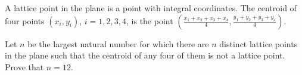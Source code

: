 A lattice point in the plane is a point with integral coordinates. The centroid of four points $(x_i,y_i )$,  $i = 1, 2, 3, 4$,  is the point  $\left(\frac{x_1 +x_2 +x_3 +x_4}{4},\frac{y_1 +y_2 +y_3 +y_4 }{4}\right)$.

Let $n$ be the largest natural number for which there are $n$ distinct lattice points in the plane such that the centroid of any four of them is not a lattice point. Prove that $n = 12$.